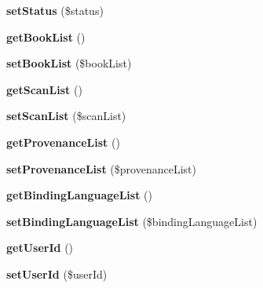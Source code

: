 \begin{DoxyCompactItemize}
\item 
\hypertarget{classBinding_a6bd66c00b0a33127aeb1cce30e426128}{
{\bfseries setStatus} (\$status)}
\label{classBinding_a6bd66c00b0a33127aeb1cce30e426128}

\item 
\hypertarget{classBinding_aa78ebce7e2f96c5cf793a2abb7dbfbee}{
{\bfseries getBookList} ()}
\label{classBinding_aa78ebce7e2f96c5cf793a2abb7dbfbee}

\item 
\hypertarget{classBinding_a1c84609158a243b7282801a33fb4d313}{
{\bfseries setBookList} (\$bookList)}
\label{classBinding_a1c84609158a243b7282801a33fb4d313}

\item 
\hypertarget{classBinding_a91b5bbc04ceb8cfa4675a807c1ef2be6}{
{\bfseries getScanList} ()}
\label{classBinding_a91b5bbc04ceb8cfa4675a807c1ef2be6}

\item 
\hypertarget{classBinding_aa7df03c55ab408b1787871d5ffbe78cc}{
{\bfseries setScanList} (\$scanList)}
\label{classBinding_aa7df03c55ab408b1787871d5ffbe78cc}

\item 
\hypertarget{classBinding_ac793688f2e9316ac60ed807965f648e4}{
{\bfseries getProvenanceList} ()}
\label{classBinding_ac793688f2e9316ac60ed807965f648e4}

\item 
\hypertarget{classBinding_a8710fe7e69ac1f2ccda04ad5e3d20274}{
{\bfseries setProvenanceList} (\$provenanceList)}
\label{classBinding_a8710fe7e69ac1f2ccda04ad5e3d20274}

\item 
\hypertarget{classBinding_a25e67f962bf4cc9324d9b2579785032b}{
{\bfseries getBindingLanguageList} ()}
\label{classBinding_a25e67f962bf4cc9324d9b2579785032b}

\item 
\hypertarget{classBinding_a76f118ba96e8fefbf419bdac2d128e68}{
{\bfseries setBindingLanguageList} (\$bindingLanguageList)}
\label{classBinding_a76f118ba96e8fefbf419bdac2d128e68}

\item 
\hypertarget{classBinding_a3be827b9389fe7900bced4dc091e3a0d}{
{\bfseries getUserId} ()}
\label{classBinding_a3be827b9389fe7900bced4dc091e3a0d}

\item 
\hypertarget{classBinding_a8eaf8c4dd247d19d4e49779a23360474}{
{\bfseries setUserId} (\$userId)}
\label{classBinding_a8eaf8c4dd247d19d4e49779a23360474}

\end{DoxyCompactItemize}
